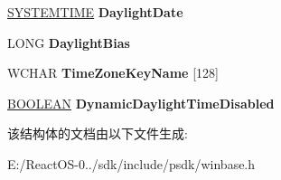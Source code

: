 \begin{DoxyCompactItemize}
\mbox{\label{struct___t_i_m_e___d_y_n_a_m_i_c___z_o_n_e___i_n_f_o_r_m_a_t_i_o_n_a42e0be1c456ab26d982b4be8a29223f3}} 
\hyperlink{struct___s_y_s_t_e_m_t_i_m_e}{S\+Y\+S\+T\+E\+M\+T\+I\+ME} {\bfseries Daylight\+Date}
\item 
\mbox{\label{struct___t_i_m_e___d_y_n_a_m_i_c___z_o_n_e___i_n_f_o_r_m_a_t_i_o_n_a3fa2e1ea81299661de5f91b7869ca6c6}} 
L\+O\+NG {\bfseries Daylight\+Bias}
\item 
\mbox{\label{struct___t_i_m_e___d_y_n_a_m_i_c___z_o_n_e___i_n_f_o_r_m_a_t_i_o_n_a18fd2d95265da847ba79f37fcce4e70e}} 
W\+C\+H\+AR {\bfseries Time\+Zone\+Key\+Name} \mbox{[}128\mbox{]}
\item 
\mbox{\label{struct___t_i_m_e___d_y_n_a_m_i_c___z_o_n_e___i_n_f_o_r_m_a_t_i_o_n_af348018556ba43dd730a084ad8e65933}} 
\hyperlink{_processor_bind_8h_a112e3146cb38b6ee95e64d85842e380a}{B\+O\+O\+L\+E\+AN} {\bfseries Dynamic\+Daylight\+Time\+Disabled}
\end{DoxyCompactItemize}


该结构体的文档由以下文件生成\+:\begin{DoxyCompactItemize}
\item 
E\+:/\+React\+O\+S-\/0../sdk/include/psdk/winbase.\+h\end{DoxyCompactItemize}
